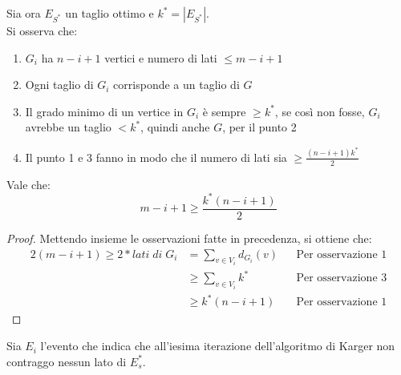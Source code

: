 \begin{remark}
    \label{osskarg}
    Sia ora $E_{S^*}$ un taglio ottimo e $k^* = |E_{S^*}|$.\\
    Si osserva che: 
    \begin{enumerate}
        \item $G_i$ ha $n-i+1$ vertici e numero di lati $\leq m-i +1$ 
        \item Ogni taglio di $G_i$ corrisponde a un taglio di $G$
        \item Il grado minimo di un vertice in $G_i$ è sempre $\geq k^*$, se così non fosse, 
        $G_i$ avrebbe un taglio $< k^*$, quindi anche $G$, per il punto 2
        \item Il punto 1 e 3 fanno in modo che il numero di lati sia $\geq \frac{(n-i+1)k^*}{2}$
    \end{enumerate}    
\end{remark}

\begin{lemma}
    \label{lkarg}
    Vale che:
    $$m-i+1 \geq \frac{k^*(n-i+1)}{2}$$
\end{lemma}
\begin{proof}
    Mettendo insieme le osservazioni fatte in precedenza, si ottiene che:
    \begin{equation}
        \begin{aligned}
            2(m - i + 1 ) \geq 2 * \mathit{lati\;di\;G_i} &= \sum_{v \in V_i} d_{G_i}(v) && \text{Per osservazione 1}\\
            &\geq \sum_{v \in V_i} k^* && \text{Per osservazione 3}\\
            &\geq k^*(n-i+1) && \text{Per osservazione 1}
        \end{aligned}
    \end{equation}
\end{proof}

Sia $E_i$ l'evento che indica che all'iesima iterazione dell'algoritmo di Karger non contraggo nessun lato 
di $E_s^*$.

